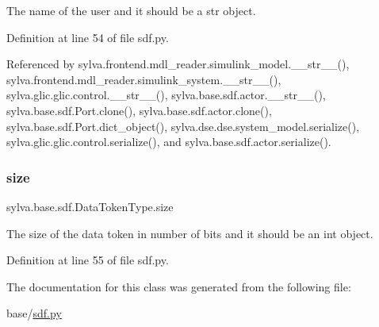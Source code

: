 The name of the user and it should be a str object. 



Definition at line 54 of file sdf.\+py.



Referenced by sylva.\+frontend.\+mdl\+\_\+reader.\+simulink\+\_\+model.\+\_\+\+\_\+str\+\_\+\+\_\+(), sylva.\+frontend.\+mdl\+\_\+reader.\+simulink\+\_\+system.\+\_\+\+\_\+str\+\_\+\+\_\+(), sylva.\+glic.\+glic.\+control.\+\_\+\+\_\+str\+\_\+\+\_\+(), sylva.\+base.\+sdf.\+actor.\+\_\+\+\_\+str\+\_\+\+\_\+(), sylva.\+base.\+sdf.\+Port.\+clone(), sylva.\+base.\+sdf.\+actor.\+clone(), sylva.\+base.\+sdf.\+Port.\+dict\+\_\+object(), sylva.\+dse.\+dse.\+system\+\_\+model.\+serialize(), sylva.\+glic.\+glic.\+control.\+serialize(), and sylva.\+base.\+sdf.\+actor.\+serialize().

\mbox{\label{classsylva_1_1base_1_1sdf_1_1_data_token_type_abf397c07db4eced64bf773de13fcbbf0}} 
\subsubsection{\texorpdfstring{size}{size}}
{\footnotesize\ttfamily sylva.\+base.\+sdf.\+Data\+Token\+Type.\+size}



The size of the data token in number of bits and it should be an int object. 



Definition at line 55 of file sdf.\+py.



The documentation for this class was generated from the following file\+:\begin{DoxyCompactItemize}
\item 
base/\hyperlink{sdf_8py}{sdf.\+py}\end{DoxyCompactItemize}
